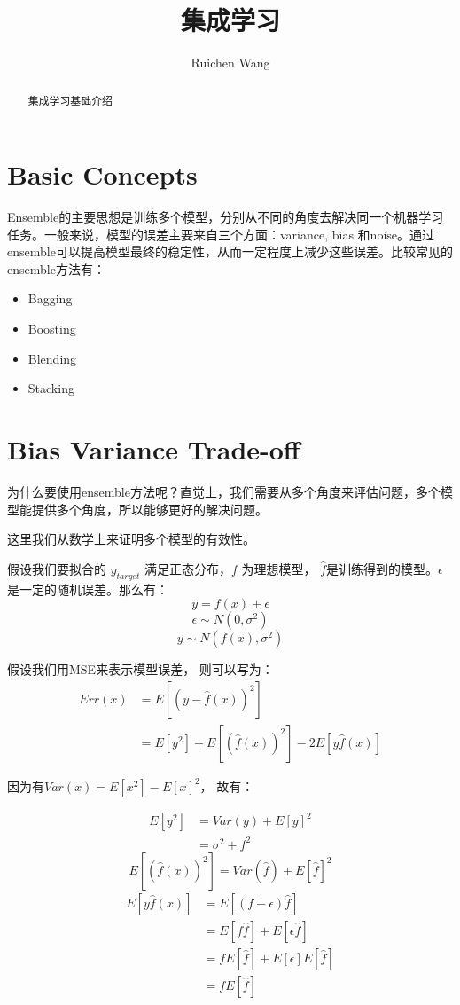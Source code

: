 \documentclass[12pt,a4paper,oneside]{article}
\author{Ruichen Wang}
\title{集成学习}
\begin{document}
\begin{CJK*}{UTF8}{gbsn}

\maketitle
\begin{abstract}
集成学习基础介绍
\end{abstract}

\tableofcontents

\section{Basic Concepts}
Ensemble的主要思想是训练多个模型，分别从不同的角度去解决同一个机器学习任务。一般来说，模型的误差主要来自三个方面：variance, bias 和noise。通过ensemble可以提高模型最终的稳定性，从而一定程度上减少这些误差。比较常见的ensemble方法有：
\begin{itemize}
\item Bagging
\item Boosting
\item Blending
\item Stacking
\end{itemize}


\section{Bias Variance Trade-off}

为什么要使用ensemble方法呢？直觉上，我们需要从多个角度来评估问题，多个模型能提供多个角度，所以能够更好的解决问题。

这里我们从数学上来证明多个模型的有效性。

假设我们要拟合的 $y_{target}$ 满足正态分布，$f$ 为理想模型， $\hat{f}$是训练得到的模型。$\epsilon$ 是一定的随机误差。那么有：
$$y=f(x)+\epsilon$$
$$\epsilon \sim N(0,\sigma^{2})$$
$$y \sim N(f(x), \sigma^{2})$$

假设我们用MSE来表示模型误差， 则可以写为：
\begin{align*}
Err(x) &=E \left[ \left(y-\hat{f}(x)\right)^{2} \right] \\ 
 &=E \left[y^{2} \right] + E \left[ \left(\hat{f}(x) \right)^{2} \right]-2E \left[y\hat{f}(x) \right]
\end{align*}

因为有$Var(x)=E\left[x^{2} \right] - E\left[x \right]^{2}$， 故有：

\begin{align*}
E\left[y^{2} \right] &= Var(y) + E\left[y \right]^{2} \\
&= \sigma^{2} +f^{2}
\end{align*}
$$E \left[ \left(\hat{f}(x) \right)^{2} \right] = Var\left( \hat{f}\right) + E\left[\hat{f} \right]^{2}$$
\begin{align*}
E \left[y\hat{f}(x) \right] &= E\left[(f+\epsilon) \hat{f} \right] \\
&= E\left[f \hat{f} \right] + E\left[\epsilon \hat{f} \right] \\ 
&= fE\left[ \hat{f} \right] +E\left[ \epsilon \right]E\left[ \hat{f} \right] \\
&= fE\left[ \hat{f} \right]
\end{align*}


\end{CJK*}
\end{document}
